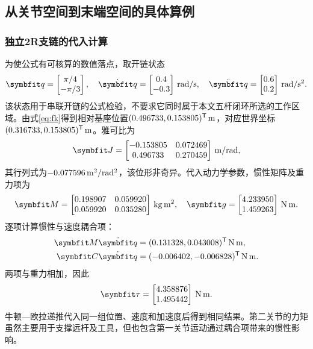 \subsection{从关节空间到末端空间的具体算例}

\subsubsection{独立2R支链的代入计算}

为使公式有可核算的数值落点，取开链状态
\begin{equation}
\vect q=\begin{bmatrix}\pi/4\\-\pi/3\end{bmatrix},\quad
\dot{\vect q}=\begin{bmatrix}0.4\\-0.3\end{bmatrix}\units{rad/s},\quad
\ddot{\vect q}=\begin{bmatrix}0.6\\0.2\end{bmatrix}\units{rad/s^2}.
\end{equation}
该状态用于串联开链的公式检验，不要求它同时属于本文五杆闭环所选的工作区域。由式\eqref{eq:fk}得到相对基座位置$(0.496733,0.153805)^\mathsf T\,\mathrm{m}$，对应世界坐标$(0.316733,0.153805)^\mathsf T\,\mathrm{m}$。雅可比为
\begin{equation}
\vect J=\begin{bmatrix}-0.153805&0.072469\\0.496733&0.270459\end{bmatrix}\units{m/rad},
\end{equation}
其行列式为$-0.077596\,\mathrm{m^2/rad^2}$，该位形非奇异。代入动力学参数，惯性矩阵及重力项为
\begin{equation}
\vect M=\begin{bmatrix}0.198907&0.059920\\0.059920&0.035280\end{bmatrix}\units{kg\,m^2},\quad
\vect g=\begin{bmatrix}4.233950\\1.459263\end{bmatrix}\units{N\,m}.
\end{equation}
逐项计算惯性与速度耦合项：
\begin{align}
\vect M\ddot{\vect q}&=(0.131328,0.043008)^\T\units{N\,m},\\
\vect C\dot{\vect q}&=(-0.006402,-0.006828)^\T\units{N\,m}.
\end{align}
两项与重力相加，因此
\begin{equation}
\vect\tau=\begin{bmatrix}4.358876\\1.495442\end{bmatrix}\units{N\,m}.
\end{equation}
牛顿—欧拉递推代入同一组位置、速度和加速度后得到相同结果。第二关节的力矩虽然主要用于支撑远杆及工具，但也包含第一关节运动通过耦合项带来的惯性影响。

